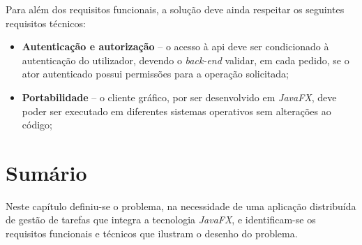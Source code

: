 \noindent Para além dos requisitos funcionais, a solução deve ainda respeitar os seguintes requisitos técnicos:

\begin{itemize}
	\item \textbf{Autenticação e autorização} -- o acesso à \ac{api} deve ser condicionado à autenticação do utilizador, devendo o \textit{back-end} validar, em cada pedido, se o ator autenticado possui permissões para a operação solicitada;
	\item \textbf{Portabilidade} -- o cliente gráfico, por ser desenvolvido em \textit{JavaFX}, deve poder ser executado em diferentes sistemas operativos sem alterações ao código;
\end{itemize}

\section{Sumário}

\noindent Neste capítulo definiu-se o problema, na necessidade de uma aplicação distribuída de gestão de tarefas que integra a tecnologia \textit{JavaFX}, e identificam-se os requisitos funcionais e técnicos que ilustram o desenho do problema.
